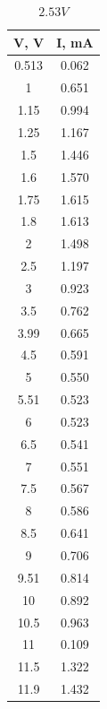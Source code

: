 \documentclass{article}
\begin{document}
\begin{table}[H]
\centering
\begin{tabular}{|c|c|}
\hline
V, V & I, mA      \\\hline
0.513   & 0.062 \\\hline
1       & 0.651  \\\hline
1.15    & 0.994  \\\hline
1.25    & 1.167  \\\hline
1.5     & 1.446  \\\hline
1.6     & 1.570   \\\hline
1.75    & 1.615  \\\hline
1.8     & 1.613  \\\hline
2       & 1.498  \\\hline
2.5     & 1.197  \\\hline
3       & 0.923  \\\hline
3.5     & 0.762  \\\hline
3.99    & 0.665  \\\hline
4.5     & 0.591 \\\hline
5       & 0.550   \\\hline
5.51    & 0.523  \\\hline
6       & 0.523  \\\hline
6.5     & 0.541  \\\hline
7       & 0.551  \\\hline
7.5     & 0.567  \\\hline
8       & 0.586  \\\hline
8.5     & 0.641  \\\hline
9       & 0.706  \\\hline
9.51    & 0.814  \\\hline
10      & 0.892 \\\hline
10.5    & 0.963  \\\hline
11      & 0.109   \\\hline
11.5    & 1.322  \\\hline
11.9    & 1.432  \\\hline
\end{tabular}
	\caption{\(2.53V\)}
\end{table}
\end{document}
